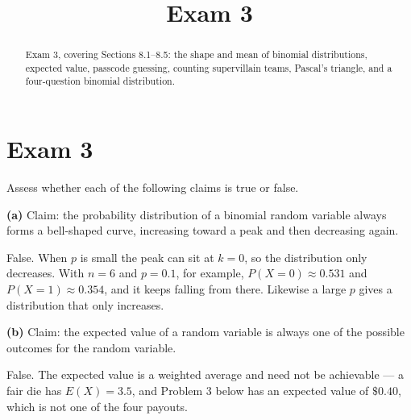 \documentclass[12pt]{ximera}
\title{Exam 3}
\begin{document}
\begin{abstract}
Exam 3, covering Sections 8.1--8.5: the shape and mean of binomial distributions,
expected value, passcode guessing, counting supervillain teams, Pascal's triangle, and
a four-question binomial distribution.
\end{abstract}
\maketitle

\section*{Exam 3}

\begin{problem}
Assess whether each of the following claims is true or false.

\begin{prompt}
\textbf{(a)} Claim: the probability distribution of a binomial random variable always
forms a bell-shaped curve, increasing toward a peak and then decreasing again.

\begin{multipleChoice}
\end{multipleChoice}

\begin{feedback}
False. When $p$ is small the peak can sit at $k=0$, so the distribution only
decreases. With $n=6$ and $p=0.1$, for example, $P(X=0)\approx 0.531$ and
$P(X=1)\approx 0.354$, and it keeps falling from there. Likewise a large $p$ gives a
distribution that only increases.
\end{feedback}
\end{prompt}

\begin{prompt}
\textbf{(b)} Claim: the expected value of a random variable is always one of the possible
outcomes for the random variable.

\begin{multipleChoice}
\end{multipleChoice}

\begin{feedback}
False. The expected value is a weighted average and need not be achievable --- a fair
die has $E(X)=3.5$, and Problem 3 below has an expected value of $\$0.40$, which is not
one of the four payouts.
\end{feedback}
\end{prompt}
\end{problem}
\end{document}
